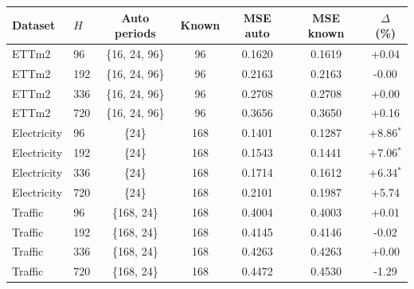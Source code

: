 \begin{tabular}{llccccc}
\toprule
\textbf{Dataset} & $H$ & \textbf{Auto periods} & \textbf{Known} & \textbf{MSE auto} & \textbf{MSE known} & \textbf{$\Delta$ (\%)} \\
\midrule
ETTm2 & 96 & \{16, 24, 96\} & 96 & 0.1620 & 0.1619 & +0.04 \\
ETTm2 & 192 & \{16, 24, 96\} & 96 & 0.2163 & 0.2163 & -0.00 \\
ETTm2 & 336 & \{16, 24, 96\} & 96 & 0.2708 & 0.2708 & +0.00 \\
ETTm2 & 720 & \{16, 24, 96\} & 96 & 0.3656 & 0.3650 & +0.16 \\
\midrule
Electricity & 96 & \{24\} & 168 & 0.1401 & 0.1287 & +8.86$^{*}$ \\
Electricity & 192 & \{24\} & 168 & 0.1543 & 0.1441 & +7.06$^{*}$ \\
Electricity & 336 & \{24\} & 168 & 0.1714 & 0.1612 & +6.34$^{*}$ \\
Electricity & 720 & \{24\} & 168 & 0.2101 & 0.1987 & +5.74 \\
\midrule
Traffic & 96 & \{168, 24\} & 168 & 0.4004 & 0.4003 & +0.01 \\
Traffic & 192 & \{168, 24\} & 168 & 0.4145 & 0.4146 & -0.02 \\
Traffic & 336 & \{168, 24\} & 168 & 0.4263 & 0.4263 & +0.00 \\
Traffic & 720 & \{168, 24\} & 168 & 0.4472 & 0.4530 & -1.29 \\
\bottomrule
\end{tabular}
